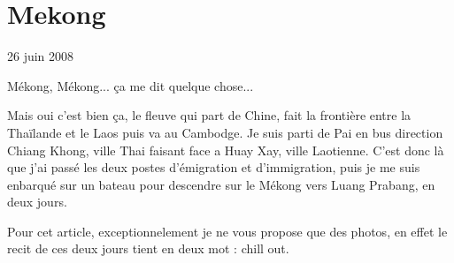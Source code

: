 \section{Mekong}

26 juin 2008

\begin{multicols}{2}

Mékong, Mékong... ça me dit quelque chose...

Mais oui c'est bien ça, le fleuve qui part de Chine, fait la frontière entre la Thaïlande et le Laos puis va au Cambodge. Je suis parti de Pai en bus direction Chiang Khong, ville Thai faisant face a Huay Xay, ville Laotienne. C'est donc là que j'ai passé les deux postes d'émigration et d'immigration, puis je me suis enbarqué sur un bateau pour descendre sur le Mékong vers Luang Prabang, en deux jours.

Pour cet article, exceptionnelement je ne vous propose que des photos, en effet le recit de ces deux jours tient en deux mot : chill out.






\end{multicols}


